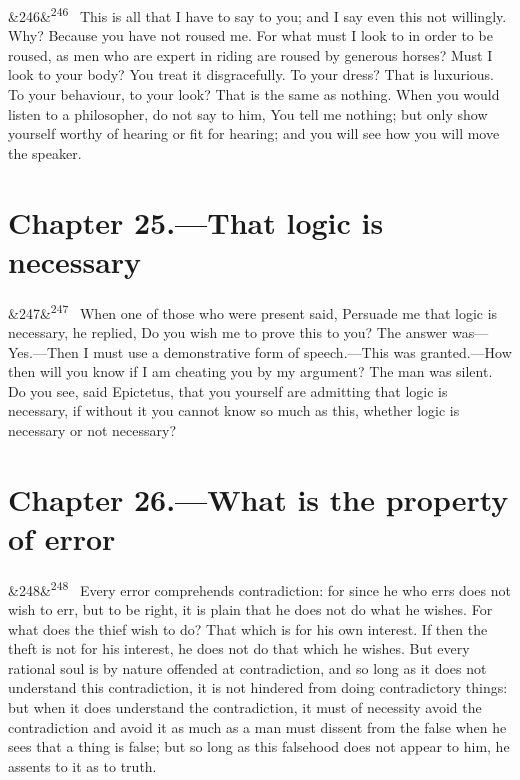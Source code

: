 \documentclass[12pt]{article}
\newcommand{\para}[1][]{\par\noindent\ifx&#1&\else\textsuperscript{\footnotesize #1}~\fi}
\begin{document}
\para[246] This is all that I have to say to you; and I say even this not willingly. Why? Because you have not roused me. For what must I look to in order to be roused, as men who are expert in riding are roused by generous horses? Must I look to your body? You treat it disgracefully. To your dress? That is luxurious. To your behaviour, to your look? That is the same as nothing. When you would listen to a philosopher, do not say to him, You tell me nothing; but only show yourself worthy of hearing or fit for hearing; and you will see how you will move the speaker.

\section*{Chapter 25.---That logic is necessary}

\para[247] When one of those who were present said, Persuade me that logic is necessary, he replied, Do you wish me to prove this to you? The answer was—Yes.—Then I must use a demonstrative form of speech.—This was granted.—How then will you know if I am cheating you by my argument? The man was silent. Do you see, said Epictetus, that you yourself are admitting that logic is necessary, if without it you cannot know so much as this, whether logic is necessary or not necessary?

\section*{Chapter 26.---What is the property of error}

\para[248] Every error comprehends contradiction: for since he who errs does not wish to err, but to be right, it is plain that he does not do what he wishes. For what does the thief wish to do? That which is for his own interest. If then the theft is not for his interest, he does not do that which he wishes. But every rational soul is by nature offended at contradiction, and so long as it does not understand this contradiction, it is not hindered from doing contradictory things: but when it does understand the contradiction, it must of necessity avoid the contradiction and avoid it as much as a man must dissent from the false when he sees that a thing is false; but so long as this falsehood does not appear to him, he assents to it as to truth.
\end{document}
